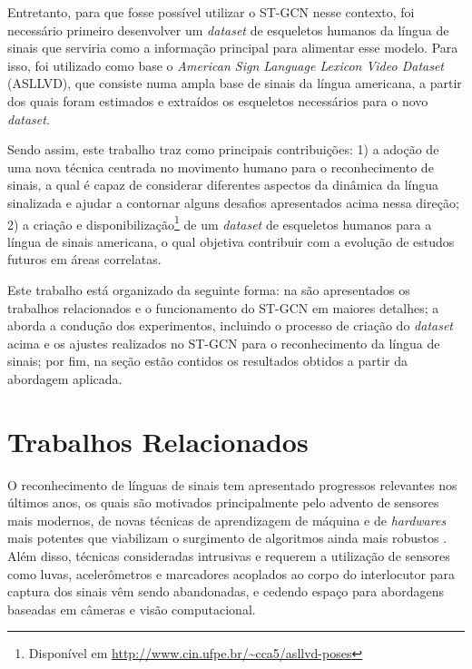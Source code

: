 Entretanto, para que fosse possível utilizar o ST-GCN nesse contexto, foi necessário primeiro desenvolver um \textit{dataset} de esqueletos humanos da língua de sinais que serviria como a informação principal para alimentar esse modelo. Para isso, foi utilizado como base o \textit{American Sign Language Lexicon Video Dataset} (ASLLVD), que consiste numa ampla base de sinais da língua americana, a partir dos quais foram estimados e extraídos os esqueletos necessários para o novo \textit{dataset}.

Sendo assim, este trabalho traz como principais contribuições: 1) a adoção de uma nova técnica centrada no movimento humano para o reconhecimento de sinais, a qual é capaz de considerar diferentes aspectos da dinâmica da língua sinalizada e ajudar a contornar alguns desafios apresentados acima nessa direção; 2) a criação e disponibilização\footnote{
    Disponível em \url{http://www.cin.ufpe.br/~cca5/asllvd-poses}
} de um \textit{dataset} de esqueletos humanos para a língua de sinais americana, o qual objetiva contribuir com a evolução de estudos futuros em áreas correlatas.

Este trabalho está organizado da seguinte forma: na  são apresentados os trabalhos relacionados e o funcionamento do ST-GCN em maiores detalhes; a  aborda a condução dos experimentos, incluindo o processo de criação do \textit{dataset} acima e os ajustes realizados no ST-GCN para o reconhecimento da língua de sinais; por fim, na seção  estão contidos os resultados obtidos a partir da abordagem aplicada.



\section{Trabalhos Relacionados} %
\label{sec:trabalhos-relacionados}

O reconhecimento de línguas de sinais tem apresentado progressos relevantes nos últimos anos, os quais são motivados principalmente pelo advento de sensores mais modernos, de novas técnicas de aprendizagem de máquina e de \textit{hardwares} mais potentes que viabilizam o surgimento de algoritmos ainda mais robustos \cite{recent-advances-dl-2017, recent-advances-sl-2013}. Além disso, técnicas consideradas intrusivas e requerem a utilização de sensores como luvas, acelerômetros e marcadores acoplados ao corpo do interlocutor para captura dos sinais vêm sendo abandonadas, e cedendo espaço para abordagens baseadas em câmeras e visão computacional.

